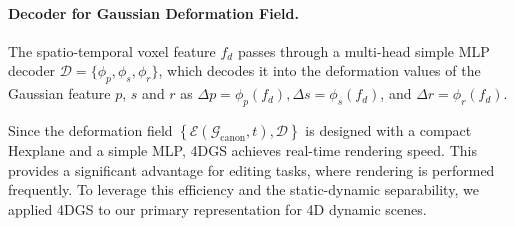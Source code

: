 \vspace{-4mm}
\paragraph{Decoder for Gaussian Deformation Field.}
 The spatio-temporal voxel feature $f_d$ passes through a multi-head simple MLP decoder $\mathcal{D}=\{\phi_p, \phi_s, \phi_r\}$, which decodes it into the deformation values of the Gaussian feature $p$, $s$ and $r$ as $\Delta p=\phi_p(f_d), \Delta s=\phi_s(f_d)$, and $\Delta r=\phi_r(f_d)$.
 
 Since the deformation field $\left\{\mathcal{E}(\mathcal{G}_{\text{canon}}, t), \mathcal{D}\right\}$ is designed with a compact Hexplane and a simple MLP, 4DGS achieves real-time rendering speed. This provides a significant advantage for editing tasks, where rendering is performed frequently. To leverage this efficiency and the static-dynamic separability, we applied 4DGS to our primary representation for 4D dynamic scenes.
